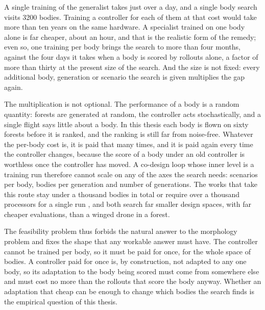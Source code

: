 A single training of the generalist takes just over a day, and a single body search visits 3200 bodies. Training a controller for each of them at that cost would take more than ten years on the same hardware. A specialist trained on one body alone is far cheaper, about an hour, and that is the realistic form of the remedy; even so, one training per body brings the search to more than four months, against the four days it takes when a body is scored by rollouts alone, a factor of more than thirty at the present size of the search. And the size is not fixed: every additional body, generation or scenario the search is given multiplies the gap again.

The multiplication is not optional. The performance of a body is a random quantity: forests are generated at random, the controller acts stochastically, and a single flight says little about a body. In this thesis each body is flown on sixty forests before it is ranked, and the ranking is still far from noise-free. Whatever the per-body cost is, it is paid that many times, and it is paid again every time the controller changes, because the score of a body under an old controller is worthless once the controller has moved. A co-design loop whose inner level is a training run therefore cannot scale on any of the axes the search needs: scenarios per body, bodies per generation and number of generations. The works that take this route stay under a thousand bodies in total \cite{muff2026hexacopters} or require over a thousand processors for a single run \cite{gupta2021embodied}, and both search far smaller design spaces, with far cheaper evaluations, than a winged drone in a forest.

The feasibility problem thus forbids the natural answer to the morphology problem and fixes the shape that any workable answer must have. The controller cannot be trained per body, so it must be paid for once, for the whole space of bodies. A controller paid for once is, by construction, not adapted to any one body, so its adaptation to the body being scored must come from somewhere else and must cost no more than the rollouts that score the body anyway. Whether an adaptation that cheap can be enough to change which bodies the search finds is the empirical question of this thesis.
